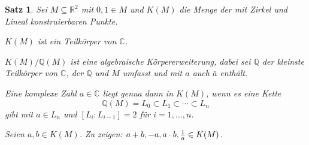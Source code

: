\documentclass[a4paper,10pt,german]{scrbook}
\theoremstyle{saetze}
\newtheorem{Satz}{Satz}
\theoremstyle{definitionen}
\begin{document}
\begin{Satz}
Sei $M\subseteq \mathbb R^2$ mit $0,1\in M$ und $K(M)$ die Menge der mit Zirkel und Lineal konstruierbaren Punkte.
\begin{enum}
\item $K(M)$ ist ein Teilkörper von $\mathbb C$.
\item $K(M)/\mathbb Q(M)$ ist eine algebraische Körpererweiterung, dabei sei $\mathbb Q$ der kleinste Teilkörper von $\mathbb C$, der $\mathbb Q$ und $M$ umfasst und mit $a$ auch $\bar a$ enthält.
\item Eine komplexe Zahl $a\in \mathbb C$ liegt genua dann in $K(M)$, wenn es eine Kette
\[
\mathbb Q(M) = L_0\subset L_1\subset \cdots \subset L_n
\]
gibt mit $a\in L_n$ und $[L_i:L_{i-1}]=2$ für $i=1,\ldots,n$.
\end{enum}

\bew{} {
\item 
Seien $a,b \in K(M)$. Zu zeigen: $a+b, -a, a \cdot b, \frac{1}{a} \in
K(M)$.

}
\end{Satz}
\end{document}
